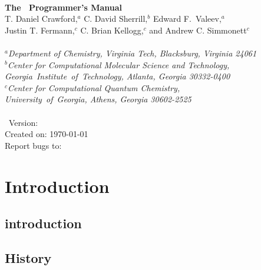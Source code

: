 \documentclass[12pt]{article}
\begin{document}


\initfuncdesc

\begin{center}
\ \\
\vspace{2.0in}
{\bf {\Large The \PSIfour\ Programmer's Manual}} \\
\vspace{0.5in} 
T. Daniel Crawford,$^a$ C. David Sherrill,$^b$ Edward F.\ Valeev,$^{a}$ \\
Justin T. Fermann,$^c$ C. Brian Kellogg,$^c$ and Andrew C. Simmonett$^c$ \\ 
\ \\ 
{\em $^a$Department of Chemistry, Virginia Tech, Blacksburg, Virginia 24061} \\
\vspace{0.1in}
{\em $^b$Center for Computational Molecular Science and Technology, 
\mbox{Georgia Institute of Technology,} Atlanta, Georgia 30332-0400} \\
\vspace{0.1in}
{\em $^c$Center for Computational Quantum Chemistry, \\ 
\mbox{University of Georgia,} Athens, Georgia 30602-2525} \\
\ \\
\vspace{0.3in}
\PSIfour\ Version: \PSIversion \\
Created on: \today \\
Report bugs to: \PSIemail \\
\end{center}

\thispagestyle{empty}

\newpage
\tableofcontents

\newpage

\section{Introduction}
    \subsection{introduction} \label{introduction}
    
    \subsection{History} \label{history}
    
\end{document}
